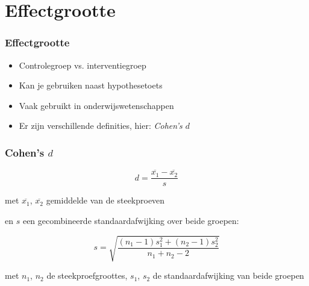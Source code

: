 \documentclass[aspectratio=169]{beamer}
\begin{document}
\section{Effectgrootte}

\begin{frame}
  \frametitle{Effectgrootte}
  
  
  \begin{itemize}
    \item Controlegroep vs. interventiegroep
    \item Kan je gebruiken naast hypothesetoets
    \item Vaak gebruikt in onderwijswetenschappen
    \item Er zijn verschillende definities, hier: \textit{Cohen's $d$}
  \end{itemize}
\end{frame}

\begin{frame}
\frametitle{Cohen's $d$}

\[ d = \frac{\overline{x_1} - \overline{x_2}}{s} \]

met $\overline{x_1}$, $\overline{x_2}$ gemiddelde van de steekproeven

en $s$ een gecombineerde standaardafwijking over beide groepen:

\[ s = \sqrt{\frac{(n_1 - 1) s_1^2 + (n_2 - 1) s_2^2}{n_1 + n_2 -2}} \]

met $n_1$, $n_2$ de steekproefgroottes, $s_1$, $s_2$ de standaardafwijking van beide groepen

\end{frame}
\end{document}

